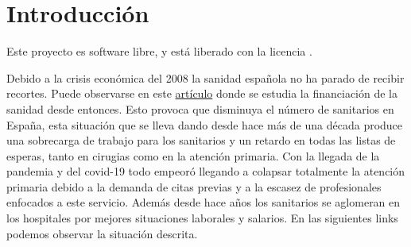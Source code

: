 \chapter{Introducción}
Este proyecto es software libre, y está liberado con la licencia \cite{gplv3}.

Debido a la crisis económica del 2008 la sanidad española no ha parado de recibir recortes.
Puede observarse en este \href{https://www.consalud.es/politica/decada-recortes-2009-2018-efectos-infrafinanciacion-sanidad_87083_102.html}{artículo}
donde se estudia la financiación de la sanidad desde entonces. Esto provoca que disminuya el número de sanitarios en España, 
esta situación que se lleva dando desde hace más de una década produce una sobrecarga de trabajo para los sanitarios y un retardo 
en todas las listas de esperas, tanto en cirugias como en la atención primaria. 
Con la llegada de la pandemia y del covid-19 todo empeoró llegando a colapsar totalmente la atención primaria debido a la demanda
de citas previas y a la escasez de profesionales enfocados a este servicio. Además desde hace años los sanitarios se aglomeran
en los hospitales por mejores situaciones laborales y salarios. En las siguientes links podemos observar la situación descrita.
